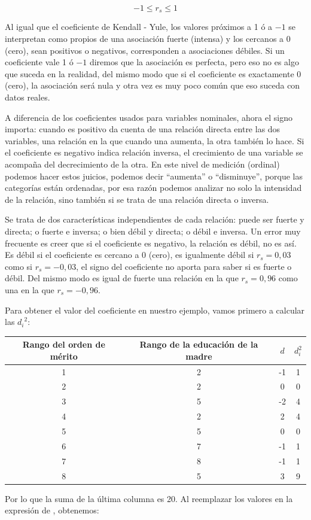 \documentclass[]{book}
\begin{document}
\[- 1 \leq r_{s} \leq 1\]

Al igual que el coeficiente de Kendall - Yule, los valores próximos a 1 ó a \(-1\) se interpretan como propios de una asociación fuerte (intensa) y
los cercanos a 0 (cero), sean positivos o negativos, corresponden a
asociaciones débiles. Si un coeficiente vale 1 ó \(-1\) diremos que la
asociación es perfecta, pero eso no es algo que suceda en la realidad,
del mismo modo que si el coeficiente es exactamente 0 (cero), la
asociación será nula y otra vez es muy poco común que eso suceda con
datos reales.

A diferencia de los coeficientes usados para variables nominales, ahora
el signo importa: cuando es positivo da cuenta de una relación directa
entre las dos variables, una relación en la que cuando una aumenta, la
otra también lo hace. Si el coeficiente es negativo indica relación
inversa, el crecimiento de una variable se acompaña del decrecimiento de
la otra. En este nivel de medición (ordinal) podemos hacer estos
juicios, podemos decir ``aumenta'' o ``disminuye'', porque las categorías
están ordenadas, por esa razón podemos analizar no solo la intensidad de
la relación, sino también si se trata de una relación directa o inversa.

Se trata de dos características independientes de cada relación: puede
ser fuerte y directa; o fuerte e inversa; o bien débil y directa; o
débil e inversa. Un error muy frecuente es creer que si el coeficiente
es negativo, la relación es débil, no es así. Es débil si el coeficiente
es cercano a 0 (cero), es igualmente débil si \(r_s=0,03\) como si
\(r_s=-0,03\), el signo del coeficiente no aporta para saber si es fuerte
o débil. Del mismo modo es igual de fuerte una relación en la que
\(r_s=0,96\) como una en la que \(r_s=-0,96\).

Para obtener el valor del coeficiente en nuestro ejemplo, vamos primero
a calcular las \({d_{i}}^{2}\):

\begin{longtable}[]{@{}cccc@{}}
\toprule
Rango del orden de mérito & Rango de la educación de la madre & \(d\) & \(d_i^2\)\tabularnewline
\midrule
\endhead
1 & 2 & -1 & 1\tabularnewline
2 & 2 & 0 & 0\tabularnewline
3 & 5 & -2 & 4\tabularnewline
4 & 2 & 2 & 4\tabularnewline
5 & 5 & 0 & 0\tabularnewline
6 & 7 & -1 & 1\tabularnewline
7 & 8 & -1 & 1\tabularnewline
8 & 5 & 3 & 9\tabularnewline
\bottomrule
\end{longtable}

Por lo que la suma de la última columna es 20. Al reemplazar los valores
en la expresión de , obtenemos:
\end{document}
